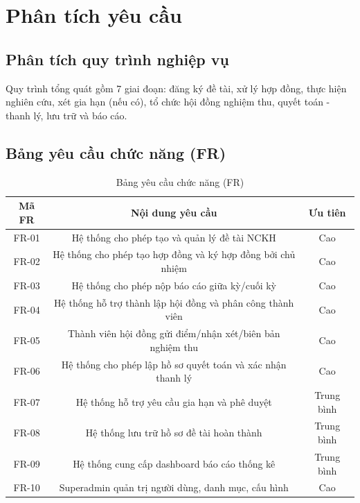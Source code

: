 \documentclass[12pt,a4paper]{report}
\begin{document}
\chapter{Phân tích yêu cầu}
\section{Phân tích quy trình nghiệp vụ}
Quy trình tổng quát gồm 7 giai đoạn: đăng ký đề tài, xử lý hợp đồng, thực hiện nghiên cứu, xét gia hạn (nếu có), tổ chức hội đồng nghiệm thu, quyết toán - thanh lý, lưu trữ và báo cáo.

\section{Bảng yêu cầu chức năng (FR)}
\begin{table}[H]
\centering
\begin{tabular}{|c|c|c|}
\hline
\textbf{Mã FR} & \textbf{Nội dung yêu cầu} & \textbf{Ưu tiên} \\ \hline
FR-01 & Hệ thống cho phép tạo và quản lý đề tài NCKH & Cao \\ \hline
FR-02 & Hệ thống cho phép tạo hợp đồng và ký hợp đồng bởi chủ nhiệm & Cao \\ \hline
FR-03 & Hệ thống cho phép nộp báo cáo giữa kỳ/cuối kỳ & Cao \\ \hline
FR-04 & Hệ thống hỗ trợ thành lập hội đồng và phân công thành viên & Cao \\ \hline
FR-05 & Thành viên hội đồng gửi điểm/nhận xét/biên bản nghiệm thu & Cao \\ \hline
FR-06 & Hệ thống cho phép lập hồ sơ quyết toán và xác nhận thanh lý & Cao \\ \hline
FR-07 & Hệ thống hỗ trợ yêu cầu gia hạn và phê duyệt & Trung bình \\ \hline
FR-08 & Hệ thống lưu trữ hồ sơ đề tài hoàn thành & Trung bình \\ \hline
FR-09 & Hệ thống cung cấp dashboard báo cáo thống kê & Trung bình \\ \hline
FR-10 & Superadmin quản trị người dùng, danh mục, cấu hình & Cao \\ \hline
\end{tabular}
\caption{Bảng yêu cầu chức năng (FR)}
\end{table}
\end{document}
